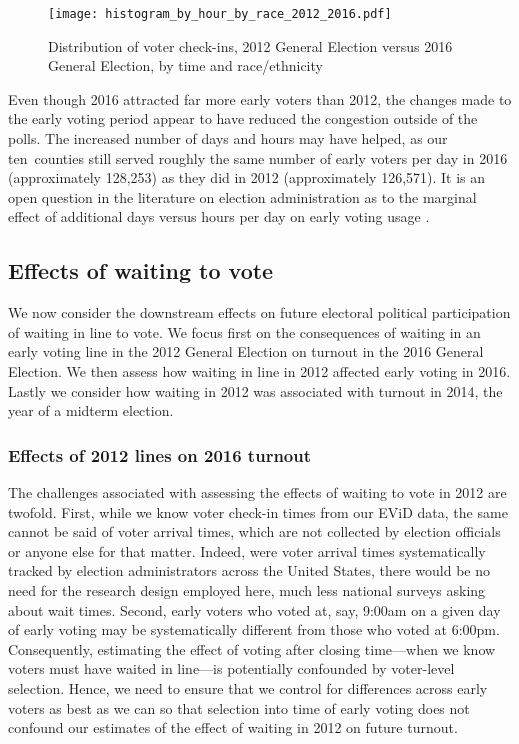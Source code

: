 \documentclass[12pt,titlepage]{article}
\newcommand{\numcounties}{ten}
\begin{document}
\begin{figure}[!ht]
  \caption{Distribution of voter check-ins, 2012 General Election
    versus 2016 General Election, by time and race/ethnicity}
  \label{fig:race2012and2016}
  \centering
  \centering\texttt{[image: histogram\_by\_hour\_by\_race\_2012\_2016.pdf]}
\end{figure}

Even though 2016 attracted far more early voters than 2012, the
changes made to the early voting period appear to have reduced the
congestion outside of the polls. The increased number of days and
hours may have helped, as our \numcounties\ counties still served
roughly the same number of early voters per day in 2016 (approximately
128,253) as they did in 2012 (approximately 126,571). It is an open
question in the literature on election administration as to the
marginal effect of additional days versus hours per day on early
voting usage \citep[e.g.,][]{walkeretal:ncearly}.



\subsection*{Effects of waiting to vote}

We now consider the downstream effects on future electoral political
participation of waiting in line to vote. We focus first on the
consequences of waiting in an early voting line in the 2012 General
Election on turnout in the 2016 General Election. We then assess how
waiting in line in 2012 affected early voting in 2016. Lastly we
consider how waiting in 2012 was associated with turnout in 2014, the
year of a midterm election.

\subsubsection*{Effects of 2012 lines on 2016 turnout}

The challenges associated with assessing the effects of waiting to
vote in 2012 are twofold.  First, while we know voter check-in times
from our EViD data, the same cannot be said of voter arrival times,
which are not collected by election officials or anyone else for that
matter.  Indeed, were voter arrival times systematically tracked by
election administrators across the United States, there would be no
need for the research design employed here, much less national surveys
asking about wait times.  Second, early voters who voted at, say,
9:00am on a given day of early voting may be systematically different
from those who voted at 6:00pm. Consequently, estimating the effect of
voting after closing time---when we know voters must have waited in
line---is potentially confounded by voter-level selection.  Hence, we
need to ensure that we control for differences across early voters as
best as we can so that selection into time of early voting does not
confound our estimates of the effect of waiting in 2012 on future
turnout.
\end{document}
